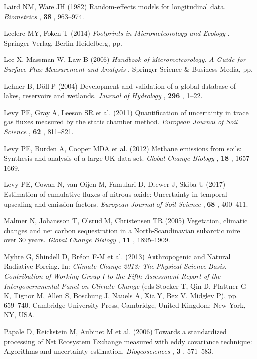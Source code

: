 \hypertarget{ref-Laird1982}{}
Laird NM, Ware JH (1982) Random-effects models for longitudinal data.
\emph{Biometrics} , \textbf{38} , 963--974.

\hypertarget{ref-Leclerc2014}{}
Leclerc MY, Foken T (2014) \emph{\textup{Footprints in Micrometeorology
and Ecology}} . Springer-Verlag, Berlin Heidelberg, pp.

\hypertarget{ref-Lee2006}{}
Lee X, Massman W, Law B (2006) \emph{\textup{Handbook of
Micrometeorology: A Guide for Surface Flux Measurement and Analysis}} .
Springer Science \& Business Media, pp.

\hypertarget{ref-Lehner2004}{}
Lehner B, Döll P (2004) Development and validation of a global database
of lakes, reservoirs and wetlands. \emph{Journal of Hydrology} ,
\textbf{296} , 1--22.

\hypertarget{ref-Levy2011}{}
Levy PE, Gray A, Leeson SR et al. (2011) Quantification of uncertainty
in trace gas fluxes measured by the static chamber method.
\emph{European Journal of Soil Science} , \textbf{62} , 811--821.

\hypertarget{ref-Levy2012}{}
Levy PE, Burden A, Cooper MDA et al. (2012) Methane emissions from
soils: Synthesis and analysis of a large UK data set. \emph{Global
Change Biology} , \textbf{18} , 1657--1669.

\hypertarget{ref-Levy2017}{}
Levy PE, Cowan N, van Oijen M, Famulari D, Drewer J, Skiba U (2017)
Estimation of cumulative fluxes of nitrous oxide: Uncertainty in
temporal upscaling and emission factors. \emph{European Journal of Soil
Science} , \textbf{68} , 400--411.

\hypertarget{ref-Malmer2005}{}
Malmer N, Johansson T, Olsrud M, Christensen TR (2005) Vegetation,
climatic changes and net carbon sequestration in a North-Scandinavian
subarctic mire over 30 years. \emph{Global Change Biology} , \textbf{11} ,
1895--1909.

\hypertarget{ref-Myhre2013}{}
Myhre G, Shindell D, Bréon F-M et al. (2013) Anthropogenic and Natural
Radiative Forcing. In: \emph{Climate Change 2013: The Physical Science
Basis. Contribution of Working Group I to the Fifth Assessment Report of
the Intergovernmental Panel on Climate Change} (eds Stocker T, Qin D,
Plattner G-K, Tignor M, Allen S, Boschung J, Nauels A, Xia Y, Bex V,
Midgley P), pp. 659--740. Cambridge University Press, Cambridge, United
Kingdom; New York, NY, USA.

\hypertarget{ref-Papale2006}{}
Papale D, Reichstein M, Aubinet M et al. (2006) Towards a standardized
processing of Net Ecosystem Exchange measured with eddy covariance
technique: Algorithms and uncertainty estimation. \emph{Biogeosciences} ,
\textbf{3} , 571--583.

